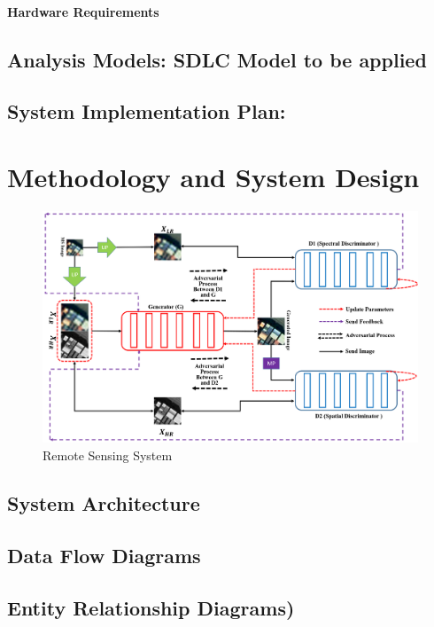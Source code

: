 \documentclass[oneside,a4paper,12pt]{report}
\begin{document}
\subsubsection{Hardware Requirements}
 
\section{Analysis Models: SDLC Model to be applied}
\section{System Implementation Plan:}

\chapter{Methodology and System Design}
\begin{figure}[H]
\begin{center}
\includegraphics[width=1.0\linewidth]{GAN_ARCH}
\caption{Remote Sensing System}
\label{Fig:f1}
\end{center}
\end{figure}

\section{System Architecture}  
\section{Data Flow Diagrams}  
	
\section{Entity Relationship Diagrams)}   
\end{document}
